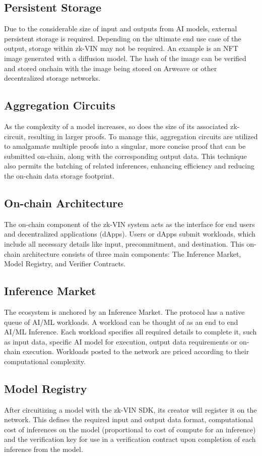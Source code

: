 \documentclass[conference]{IEEEtran}
\begin{document}
\subsection{Persistent Storage}
Due to the considerable size of input and outputs from AI models, external persistent storage is required. Depending on the ultimate end use case of the output, storage within zk-VIN may not be required. An example is an NFT image generated with a diffusion model. The hash of the image can be verified and stored onchain with the image being stored on Arweave or other decentralized storage networks.

\subsection{Aggregation Circuits}
As the complexity of a model increases, so does the size of its associated zk-circuit, resulting in larger proofs. To manage this, aggregation circuits are utilized to amalgamate multiple proofs into a singular, more concise proof that can be submitted on-chain, along with the corresponding output data. This technique also permits the batching of related inferences, enhancing efficiency and reducing the on-chain data storage footprint.

\subsection{On-chain Architecture}
The on-chain component of the zk-VIN system acts as the interface for end users and decentralized applications (dApps).  Users or dApps submit workloads, which include all necessary details like input, precommitment, and destination. This on-chain architecture consists of three main components: The Inference Market, Model Registry, and Verifier Contracts.

\subsection{Inference Market}
The ecosystem is anchored by an Inference Market. The protocol has a native queue of AI/ML workloads. A workload can be thought of as an end to end AI/ML Inference. Each workload specifies all required details to complete it, such as input data, specific AI model for execution, output data requirements or on-chain execution. Workloads posted to the network are priced according to their computational complexity.

\subsection{Model Registry}
After circuitizing a model with the zk-VIN SDK, its creator will register it on the network. This defines the required input and output data format, computational cost of inferences on the model (proportional to cost of compute for an inference) and the verification key for use in a verification contract upon completion of each inference from the model.
\end{document}
